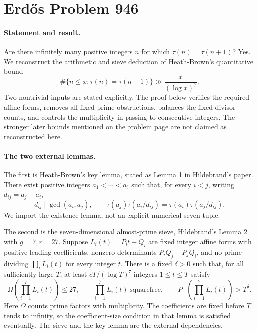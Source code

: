 \section*{Erd\H{o}s Problem 946}

\paragraph{Statement and result.}
Are there infinitely many positive integers \(n\) for which \(\tau(n)=\tau(n+1)\)? Yes. We reconstruct the arithmetic and sieve deduction of Heath-Brown's quantitative bound
\[
 \#\{n\leq x:\tau(n)=\tau(n+1)\}\gg\frac{x}{(\log x)^7}.
\]
Two nontrivial inputs are stated explicitly. The proof below verifies the required affine forms, removes all fixed-prime obstructions, balances the fixed divisor counts, and controls the multiplicity in passing to consecutive integers. The stronger later bounds mentioned on the problem page are not claimed as reconstructed here.

\paragraph{The two external lemmas.}
The first is Heath-Brown's key lemma, stated as Lemma 1 in Hildebrand's paper. There exist positive integers \(a_1<\cdots<a_7\) such that, for every \(i<j\), writing \(d_{ij}=a_j-a_i\),
\[
 d_{ij}\mid\gcd(a_i,a_j),\qquad
 \tau(a_j)\tau(a_i/d_{ij})
 =\tau(a_i)\tau(a_j/d_{ij}). \tag{1}
\]
We import the existence lemma, not an explicit numerical seven-tuple.

The second is the seven-dimensional almost-prime sieve, Hildebrand's Lemma 2 with \(g=7,r=27\). Suppose \(L_i(t)=P_i t+Q_i\) are fixed integer affine forms with positive leading coefficients, nonzero determinants \(P_iQ_j-P_jQ_i\), and no prime dividing \(\prod_iL_i(t)\) for every integer \(t\). There is a fixed \(\delta>0\) such that, for all sufficiently large \(T\), at least \(cT/(\log T)^7\) integers \(1\leq t\leq T\) satisfy
\[
 \Omega\left(\prod_{i=1}^7L_i(t)\right)\leq27,
 \qquad \prod_{i=1}^7L_i(t)\text{ squarefree},
 \qquad P^-\left(\prod_{i=1}^7L_i(t)\right)>T^\delta. \tag{2}
\]
Here \(\Omega\) counts prime factors with multiplicity. The coefficients are fixed before \(T\) tends to infinity, so the coefficient-size condition in that lemma is satisfied eventually. The sieve and the key lemma are the external dependencies.


